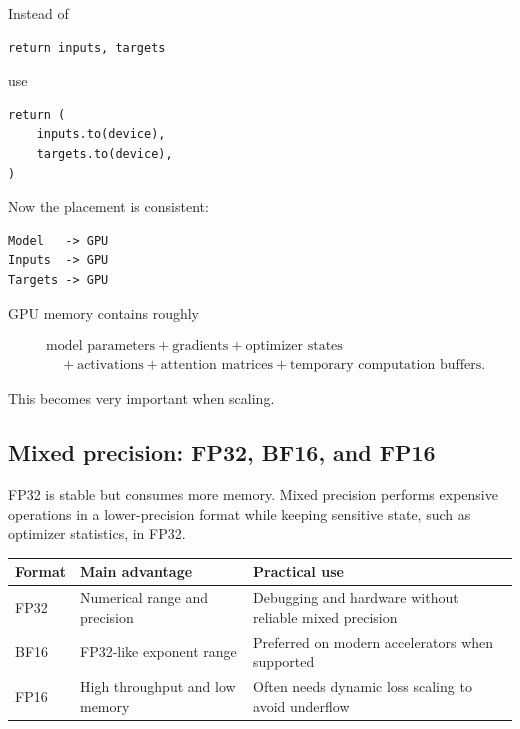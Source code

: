 Instead of

\begin{lstlisting}[style=shadedpython]
return inputs, targets
\end{lstlisting}

use

\begin{lstlisting}[style=shadedpython]
return (
    inputs.to(device),
    targets.to(device),
)
\end{lstlisting}

Now the placement is consistent:

\begin{lstlisting}[style=shadedpython,language={}]
Model   -> GPU
Inputs  -> GPU
Targets -> GPU
\end{lstlisting}

GPU memory contains roughly

\[
  \begin{aligned}
  &\text{model parameters}
  +\text{gradients}
  +\text{optimizer states}\\
  &\quad+\text{activations}
  +\text{attention matrices}
  +\text{temporary computation buffers}.
  \end{aligned}
\]

This becomes very important when scaling.

\subsection{Mixed precision: FP32, BF16, and FP16}

FP32 is stable but consumes more memory. Mixed precision performs expensive
operations in a lower-precision format while keeping sensitive state, such as
optimizer statistics, in FP32.

\begin{center}
\renewcommand{\arraystretch}{1.2}
\begin{tabular}{@{}p{}p{}p{}@{}}
  \textbf{Format} & \textbf{Main advantage} & \textbf{Practical use} \\
  \hline
  FP32 & Numerical range and precision & Debugging and hardware without reliable mixed precision \\
  BF16 & FP32-like exponent range & Preferred on modern accelerators when supported \\
  FP16 & High throughput and low memory & Often needs dynamic loss scaling to avoid underflow
\end{tabular}
\end{center}

